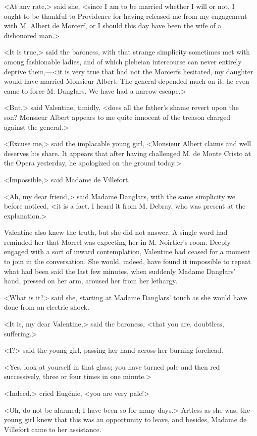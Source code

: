  <At any rate,> said she, <since I am to be married whether I will or not, I ought to be thankful to Providence for having released me from my engagement with M. Albert de Morcerf, or I should this day have been the wife of a dishonored man.> 

 <It is true,> said the baroness, with that strange simplicity sometimes met with among fashionable ladies, and of which plebeian intercourse can never entirely deprive them,—<it is very true that had not the Morcerfs hesitated, my daughter would have married Monsieur Albert. The general depended much on it; he even came to force M. Danglars. We have had a narrow escape.> 

 <But,> said Valentine, timidly, <does all the father's shame revert upon the son? Monsieur Albert appears to me quite innocent of the treason charged against the general.> 

 <Excuse me,> said the implacable young girl, <Monsieur Albert claims and well deserves his share. It appears that after having challenged M. de Monte Cristo at the Opera yesterday, he apologized on the ground today.> 

 <Impossible,> said Madame de Villefort. 

 <Ah, my dear friend,> said Madame Danglars, with the same simplicity we before noticed, <it is a fact. I heard it from M. Debray, who was present at the explanation.> 

 Valentine also knew the truth, but she did not answer. A single word had reminded her that Morrel was expecting her in M. Noirtier's room. Deeply engaged with a sort of inward contemplation, Valentine had ceased for a moment to join in the conversation. She would, indeed, have found it impossible to repeat what had been said the last few minutes, when suddenly Madame Danglars' hand, pressed on her arm, aroused her from her lethargy. 

 <What is it?> said she, starting at Madame Danglars' touch as she would have done from an electric shock. 

 <It is, my dear Valentine,> said the baroness, <that you are, doubtless, suffering.>

<I?> said the young girl, passing her hand across her burning forehead. 

 <Yes, look at yourself in that glass; you have turned pale and then red successively, three or four times in one minute.> 

 <Indeed,> cried Eugénie, <you are very pale!> 

 <Oh, do not be alarmed; I have been so for many days.> Artless as she was, the young girl knew that this was an opportunity to leave, and besides, Madame de Villefort came to her assistance. 

